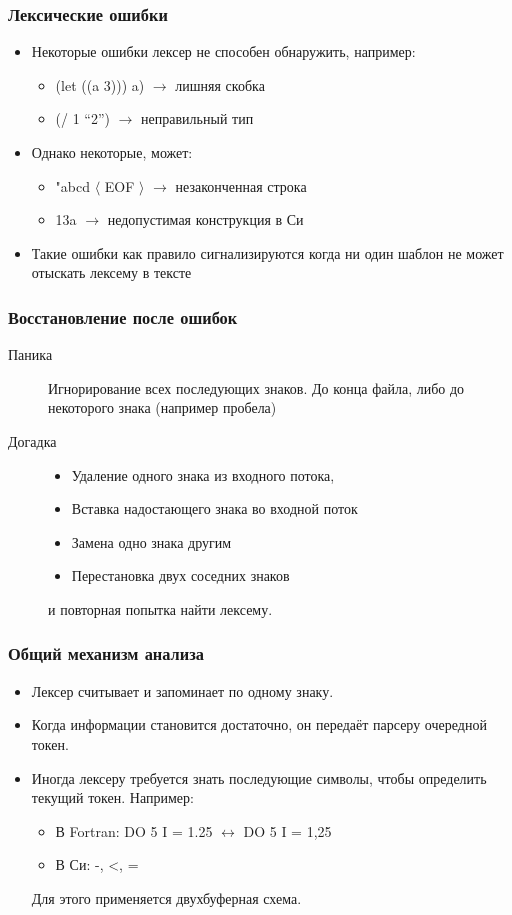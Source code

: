 \documentclass[16pt,pdf,unicode]{beamer}
\begin{document}
\begin{frame}
  \frametitle{Лексические ошибки}
  \begin{itemize}
  \item Некоторые ошибки лексер не способен обнаружить, например:
    \begin{itemize}
    \item (let ((a 3))) a) $\rightarrow$ лишняя скобка
    \item (/ 1 ``2'') $\rightarrow$ неправильный тип
    \end{itemize}
  \item Однако некоторые, может:
    \begin{itemize}
    \item "abcd  $\langle$ EOF $\rangle$ $\rightarrow$ незаконченная строка
    \item 13a $\rightarrow$ недопустимая конструкция в Си
    \end{itemize}
  \item Такие ошибки как правило сигнализируются когда ни один шаблон не может отыскать лексему в тексте
  \end{itemize}
\end{frame}

\begin{frame}
  \frametitle{Восстановление после ошибок}
  \begin{description}
  \item[Паника] Игнорирование всех последующих знаков. До конца файла, либо до некоторого знака (например пробела)
  \item[Догадка]
    \begin{itemize}
    \item Удаление одного знака из входного потока,
    \item Вставка надостающего знака во входной поток
    \item Замена одно знака другим
    \item Перестановка двух соседних знаков
    \end{itemize}
    и повторная попытка найти лексему.
  \end{description}
\end{frame}

\begin{frame}
  \frametitle{Общий механизм анализа}
  \begin{itemize}
    \item Лексер считывает и запоминает по одному знаку.
    \item Когда информации становится достаточно, он передаёт парсеру очередной токен.
    \item Иногда лексеру требуется знать последующие символы, чтобы определить текущий токен. Например:
      \begin{itemize}
      \item В Fortran: DO 5 I = 1.25 $\leftrightarrow$ DO 5 I = 1,25
      \item В Си: -, <, =
      \end{itemize}
      Для этого применяется двухбуферная схема.
  \end{itemize}
\end{frame}
\end{document}
